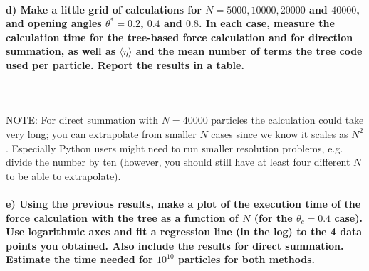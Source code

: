 \paragraph{d) Make a little grid of calculations for 
    $N=5000, 10000, 20000$ and $40000$, and opening angles 
    $\theta^*=0.2$, $0.4$ and $0.8$. In each case, measure the 
    calculation time for the tree-based force calculation and 
    for direction summation, as well as $\langle\eta\rangle$ 
    and the mean number of terms the tree code used per particle. 
    Report the results in a table.
} \ \\
    \\
    NOTE: For direct summation with $N=40000$ particles the 
    calculation could take very long; you can extrapolate from 
    smaller $N$ cases since we know it scales as $N^2$.
    Especially Python users might need to run smaller resolution 
    problems, e.g. divide the number by ten (however, you should 
    still have at least four different $N$ to be able to 
    extrapolate).

\newpage
\paragraph{e)
    Using the previous results, make a plot of the execution 
    time of the force calculation with the tree as a function of 
    $N$ (for the $\theta_c=0.4$ case). Use logarithmic axes and 
    fit a regression line (in the log) to the 4 data points you 
    obtained. Also include the results for direct summation. 
    Estimate the time needed for $10^{10}$ particles for both 
    methods.
}
